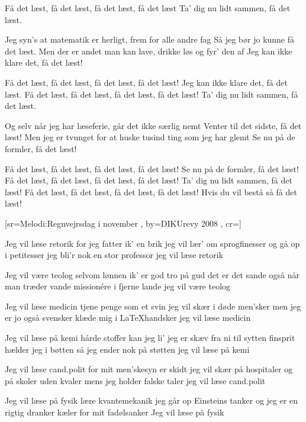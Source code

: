 \documentclass[pdftex,12pt]{article}
\begin{document}
\begin{songs}{}
\beginverse
Få det læst, få det læst, få det læst, få det læst
Ta’ dig nu lidt sammen, få det læst.
\endverse

\beginverse
Jeg syn’s at matematik er herligt, frem for alle andre fag
Så jeg bør jo kunne få det læst.
Men der er andet man kan lave, drikke løs og fyr’ den af
Jeg kan ikke klare det, få det læst!
\endverse

\beginverse
Få det læst, få det læst, få det læst, få det læst!
Jeg kan ikke klare det, få det læst.
Få det læst, få det læst, få det læst, få det læst!
Ta’ dig nu lidt sammen, få det læst.
\endverse

\beginverse
Og selv når jeg har læseferie, går det ikke særlig nemt
Venter til det sidste, få det læst!
Men jeg er tvunget for at huske tusind ting som jeg har glemt
Se nu på de formler, få det læst!
\endverse

\beginverse
Få det læst, få det læst, få det læst, få det læst!
Se nu på de formler, få det læst!
Få det læst, få det læst, få det læst, få det læst!
Ta’ dig nu lidt sammen, få det læst!
Få det læst, få det læst, få det læst, få det læst!
Hvis du vil bestå så få det læst!
\endverse
\endsong



[sr={Melodi:Regnvejrsdag i november}
,
by={DIKUrevy 2008}
,
cr={}]\hypertarget{Jeg vil læse *}{}
\label{song9}

\beginverse
Jeg vil læse retorik
for jeg fatter ik' en brik
jeg vil lær' om sprogfinesser
og gå op i petitesser
jeg bli'r nok en stor professor
jeg vil læse retorik

\endverse
\beginverse
Jeg vil være teolog
selvom lønnen ik' er god
tro på gud det er det sande
også når man træder vande
missionére i fjerne lande
jeg vil være teolog

\endverse
\beginverse
Jeg vil læse medicin
tjene penge som et svin
jeg vil skær i døde men'sker
men jeg er jo også svensker
klæde mig i \LaTeX handsker
jeg vil læse medicin

\endverse
\beginverse
Jeg vil læse på kemi
hårde stoffer kan jeg li'
jeg er skæv fra ni til sytten
finsprit hælder jeg i bøtten
så jeg ender nok på støtten
jeg vil læse på kemi

\endverse
\beginverse
Jeg vil læse cand.polit
for mit men'skesyn er skidt
jeg vil skær på hospitaler
og på skoler uden kvaler
mens jeg holder falske taler
jeg vil læse cand.polit

\endverse
\beginverse
Jeg vil læse på fysik
lære kvantemekanik
jeg går op Einsteins tanker
og jeg er en rigtig dranker
kæler for mit fadølsanker
Jeg vil læse på fysik


\end{songs}
\end{document}
